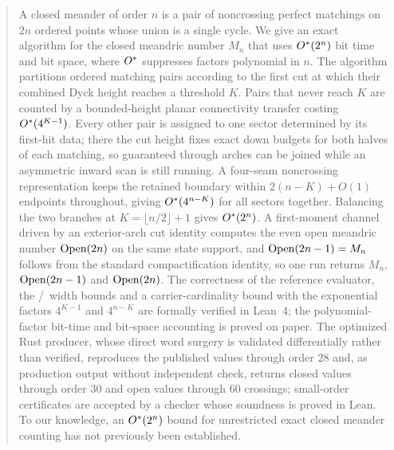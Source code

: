 \maketitle

\begin{abstract}
A closed meander of order $n$ is a pair of noncrossing perfect matchings on $2n$
ordered points whose union is a single cycle. We give an exact algorithm for the
closed meandric number $M_n$ that uses $\Ostar(2^{n})$ bit time and bit space,
where $\Ostar$ suppresses factors polynomial in $n$. The algorithm partitions
ordered matching pairs according to the first cut at which their combined Dyck
height reaches a threshold $K$. Pairs that never reach $K$ are counted by a
bounded-height planar connectivity transfer costing $\Ostar(4^{K-1})$. Every
other pair is assigned to one sector determined by its first-hit data; there the
cut height fixes exact down budgets for both halves of each matching, so
guaranteed through arches can be joined while an asymmetric inward scan is still
running. A four-seam noncrossing representation keeps the retained boundary
within $2(n-K)+O(1)$ endpoints throughout, giving $\Ostar(4^{n-K})$ for all
sectors together. Balancing the two branches at $K=\lfloor n/2\rfloor+1$ gives
$\Ostar(2^{n})$. A first-moment channel driven by an exterior-arch cut identity
computes the even open meandric number $\Open(2n)$ on the same state support,
and $\Open(2n-1)=M_n$ follows from the standard compactification identity, so one
run returns $M_n$, $\Open(2n-1)$ and $\Open(2n)$. The correctness of the
reference evaluator, the \LOW/\HIGH\ width bounds and a carrier-cardinality
bound with the exponential factors $4^{K-1}$ and $4^{n-K}$ are formally
verified in Lean~4; the polynomial-factor bit-time and bit-space accounting
is proved on paper. The optimized Rust producer, whose direct word surgery is
validated differentially rather than verified, reproduces the published
values through order $28$ and, as production output without independent
check, returns closed values through order $30$ and open values through $60$
crossings; small-order certificates are accepted by a checker whose soundness
is proved in Lean. To our knowledge, an $\Ostar(2^{n})$ bound for unrestricted exact
closed meander counting has not previously been established.
\end{abstract}
